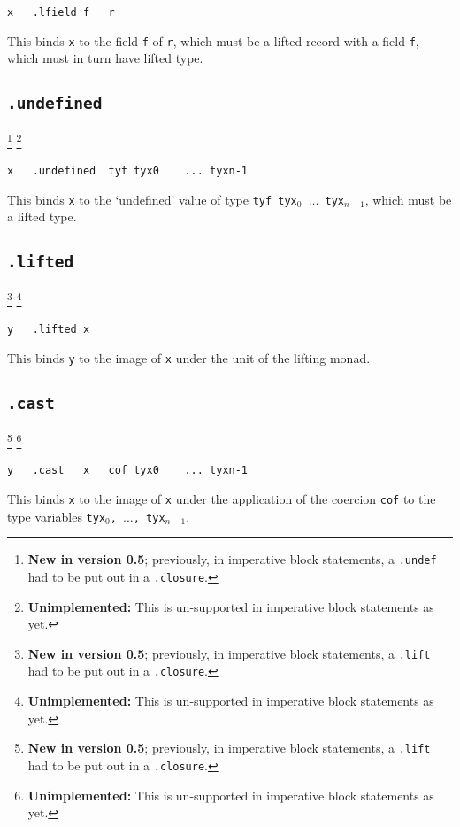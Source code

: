 \documentclass{report}
\newcommand\stringcode[1]{\texttt{#1}}
\newcommand\unimpl[1]{\footnote{\textbf{Unimplemented: }#1}}
\newcommand\new[2]{\footnote{\textbf{New in version #1}; previously, #2}}
\begin{document}
\begin{verbatim}
x	.lfield	f	r
\end{verbatim}

This binds \stringcode{x} to the field \stringcode{f} of \stringcode{r}, which must be a lifted record with a field \stringcode{f}, which must in turn have lifted type.

\subsection{\stringcode{.undefined}}
\new{0.5}{in imperative block statements, a \stringcode{.undef} had to be put out in a \stringcode{.closure}.}
\unimpl{This is un-supported in imperative block statements as yet.}

\begin{verbatim}
x	.undefined	tyf	tyx0	...	tyxn-1
\end{verbatim}

This binds \stringcode{x} to the `undefined' value of type \stringcode{tyf tyx$_0$ $\ldots$ tyx$_{n-1}$},
which must be a lifted type.

\subsection{\stringcode{.lifted}}
\new{0.5}{in imperative block statements, a \stringcode{.lift} had to be put out in a \stringcode{.closure}.}
\unimpl{This is un-supported in imperative block statements as yet.}

\begin{verbatim}
y	.lifted	x
\end{verbatim}

This binds \stringcode{y} to the image of \stringcode{x} under the unit of the lifting monad.

\subsection{\stringcode{.cast}}
\new{0.5}{in imperative block statements, a \stringcode{.lift} had to be put out in a \stringcode{.closure}.}
\unimpl{This is un-supported in imperative block statements as yet.}

\begin{verbatim}
y	.cast	x	cof	tyx0	...	tyxn-1
\end{verbatim}

This binds \stringcode{x} to the image of \stringcode{x} under the application of the coercion \stringcode{cof} to the type variables \stringcode{tyx$_0$, $\ldots$, tyx$_{n-1}$}.
\end{document}
